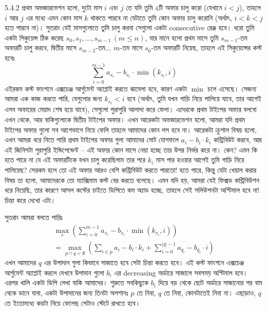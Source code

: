 \begin{Hint}{5.4.2}
প্রথম অভজারভেশন হলো, দুটো মাস $i$ এবং $j$ তে যদি তুমি ২টি অফার চালু করো (যেখানে $i < j$), তাহলে $i$ আর $j$ এর মধ্যে এমন কোন মাস $k$ থাকতে পারবে না যেটাতে তুমি কোন অফার চালু করোনি (অর্থাৎ, $i < k < j$ হতে পারবে না)। সুতরাং যেই মাসগুলোতে তুমি চালু করবা সেগুলো একটা consecutive রেঞ্জ হবে। ধরো তুমি একটা সিকুয়েন্স ঠিক করেছ $s_0, s_1, \ldots, s_{m-1} \, (m \le n)$, যার মানে হলো প্রথম মাসে তুমি $s_{m-1}$-তম অফারটি চালু করবে, দ্বিতীয় মাসে $s_{m-2}$-তম... $m$-তম মাসে $s_0$-তম অফারটি নিয়েছ, তাহলে এই সিকুয়েন্সের কস্ট হবেঃ
\[
  \sum_{i=0}^{m-1} a_{s_i} - b_{s_i} \cdot \min(k_{s_i}, i)
\]
এইরকম কস্ট ফাংশনে এক্সচেঞ্জ আর্গুমেন্ট অ্যাপ্লাই করতে ঝামেলা হবে, কারণ একটা $\min$ চলে এসেছে। সেজন্য আমরা এক কাজ করতে পারি, যেগুলোর জন্য $k_{s_i} < i$ হবে (অর্থাৎ, তুমি যখন গাড়ি নিয়ে পালিয়ে যাবে, তার আগেই এসব অফারের মেয়াদ শেষ হয়ে যাবে), সেগুলো পুরাপুরি আলাদা করে ফেলা। এদেরকে প্রথম টাইপের অফার বলবো এখন থেকে, আর বাকিগুলোকে দ্বিতীয় টাইপের অফার। এখন আরেকটা অভজারভেশন হলো, আমরা যদি প্রথম টাইপের অফার গুলো সব আগেভাগে নিয়ে ফেলি তাহলে আমাদের কোন লস হবে না। আরেকটা ক্রুশাল বিষয় হলো, এখন আমরা ধরে নিতে পারি প্রথম টাইপের অফার গুলা আমাদের মোট যোগফলে $a_i - b_i \cdot k_i$ কন্ট্রিবিউট করবে, আর এই জিনিসটা পুরাপুরি ইন্ডিপেন্ডেন্ট -- এই অফার কোন মাসে নেয়া হচ্ছে তার উপর নির্ভর করে না। কেন? এমন কি হতে পারে না যে এই অফারটিকে যখন চালু করেছিলাম তার পরে $k_i$ মাস পার হওয়ার আগেই তুমি গাড়ি নিয়ে পালিয়েছ? সেরকম হলে তো এই অফার আরও বেশি কন্ট্রিবিউট করতে পারতো! হতে পারে, কিন্তু যেটা খেয়াল করার বিষয় তা হলো, আমাদেরকে তো ম্যাক্সিমাম কস্ট বের করতে বলেছে। এমন যদি হয়, আমরা যেই ফিক্সড কন্ট্রিবিউশন ধরে নিয়েছি, তার কারণে আসল কস্টের চাইতে ডিপিতে কম অ্যাড হচ্ছে, তাহলে সেই সলিউশনটা অপ্টিমাল হবে না! চিন্তা করে দেখো এটা।

\noindent সুতরাং আমরা বলতে পারিঃ
\begin{gather*}
  \max_{s} \left ( \sum_{i=0}^{m-1} a_{s_i} - b_{s_i} \cdot \min(k_{s_i}, i) \right )\\
  = \max_{p \cap q = \emptyset} \left ( \sum_{i \in p} a_i - b_i \cdot k_i + \sum_{i=0}^{|q|-1} a_{q_i} - b_{q_i} \cdot i \right )
\end{gather*}
এখন আমাদের $q$ এর উপাদান গুলা কিভাবে সাজাতে হবে সেটা চিন্তা করতে হবে। এই কস্ট ফাংশনে এক্সচেঞ্জ আর্গুমেন্ট অ্যাপ্লাই করলে দেখবে উপাদান গুলো $b_i$ এর decreasing অর্ডারে সাজালে সবসময় অপ্টিমাল হবে। এরপর খালি একটা ডিপি লেখা বাকি আমাদের। শুরুতে সবকিছুকে $b_i$ দিয়ে বড় থেকে ছোট অর্ডারে সাজানোর পর বাম থেকে ডানে যাবা, একটা উপাদানের জন্য তিনটা অপশানঃ $p$ তে নিবা, $q$ তে নিবা, কোনটাতেই নিবা না। এছাড়াও, $q$ তে ইতোমধ্যে কয়টা নিয়ে ফেলেছ সেটাও স্টেটে রাখতে হবে।
\end{Hint}
